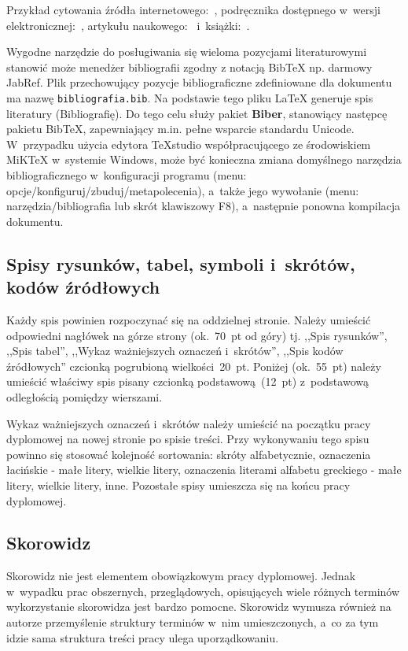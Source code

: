 \documentclass[skorowidz,skroty]{dyplomWEZUT}
\begin{document}
Przykład cytowania źródła internetowego:~\cite{Chwalowski2002}, podręcznika dostępnego w~wersji elektronicznej:~\cite{Nowacki1996,Reckdahl1997}, artykułu naukowego:~\cite{Iksinski2000} i~książki:~\cite{Honczarenko2000,Opoka2001}.

Wygodne narzędzie do posługiwania się wieloma pozycjami literaturowymi stanowić może menedżer bibliografii zgodny z notacją BibTeX np. darmowy JabRef. Plik przechowujący pozycje bibliograficzne zdefiniowane dla dokumentu ma nazwę \lstinline|bibliografia.bib|. Na podstawie tego pliku LaTeX generuje spis literatury (Bibliografię). Do tego celu służy pakiet \textbf{Biber}, stanowiący następcę pakietu BibTeX, zapewniający m.in. pełne wsparcie standardu Unicode. W~przypadku użycia edytora TeXstudio współpracującego ze środowiskiem MiKTeX w~systemie Windows, może być konieczna zmiana domyślnego narzędzia bibliograficznego w~konfiguracji programu (menu: opcje/konfiguruj/zbuduj/metapolecenia), a~także jego wywołanie (menu: narzędzia/bibliografia lub skrót klawiszowy F8), a~następnie ponowna kompilacja dokumentu.  

\subsection{Spisy rysunków, tabel, symboli i~skrótów, kodów źródłowych}

Każdy spis powinien rozpoczynać się na oddzielnej stronie. Należy umieścić odpowiedni nagłówek na górze strony (ok.~70~pt od góry) tj. ,,Spis rysunków'', ,,Spis tabel'', ,,Wykaz ważniejszych oznaczeń i~skrótów'', ,,Spis kodów źródłowych'' czcionką pogrubioną wielkości~20~pt. Poniżej (ok.~55~pt) należy umieścić właściwy spis pisany czcionką podstawową~(12~pt) z~podstawową odległością pomiędzy wierszami.

Wykaz ważniejszych oznaczeń i~skrótów należy umieścić na początku pracy dyplomowej na nowej stronie po spisie treści. Przy wykonywaniu tego spisu powinno się stosować kolejność sortowania: skróty alfabetycznie, oznaczenia łacińskie - małe litery, wielkie litery, oznaczenia literami alfabetu greckiego - małe litery, wielkie litery, inne. Pozostałe spisy umieszcza się na końcu pracy dyplomowej.

\subsection{Skorowidz}

Skorowidz nie jest elementem obowiązkowym pracy dyplomowej. Jednak w~wypadku prac obszernych, przeglądowych, opisujących wiele różnych terminów wykorzystanie skorowidza jest bardzo pomocne. Skorowidz wymusza również na autorze przemyślenie struktury terminów w~nim umieszczonych, a~co za tym idzie sama struktura treści pracy ulega uporządkowaniu.
\end{document}
